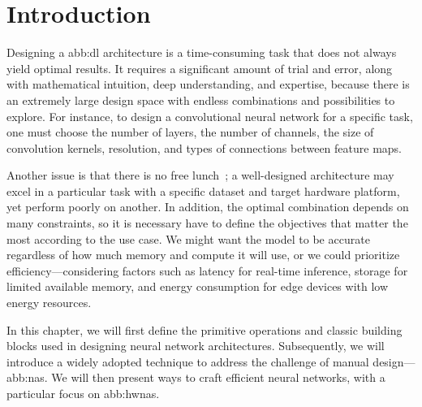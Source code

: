 \section{Introduction}\label{sec:hw-nas:intro}

Designing a \gls{abb:dl} architecture is a time-consuming task that does not always yield optimal results. It requires a significant amount of trial and error, along with mathematical intuition, deep understanding, and expertise, because there is an extremely large design space with endless combinations and possibilities to explore.  For instance, to design a convolutional neural network for a specific task, one must choose the number of layers, the number of channels, the size of convolution kernels, resolution, and types of connections between feature maps.

Another issue is that there is no free lunch~\cite{freelunch}; a well-designed architecture may excel in a particular task with a specific dataset and target hardware platform, yet perform poorly on another. In addition, the optimal combination depends on many constraints, so it is necessary have to define the objectives that matter the most according to the use case. We might want the model to be accurate regardless of how much memory and compute it will use, or we could prioritize efficiency—considering factors such as latency for real-time inference, storage for limited available memory, and energy consumption for edge devices with low energy resources.

In this chapter, we will first define the primitive operations and classic building blocks used in designing neural network architectures. Subsequently, we will introduce a widely adopted technique to address the challenge of manual design—\gls{abb:nas}. We will then present ways to craft efficient neural networks, with a particular focus on \gls{abb:hwnas}.